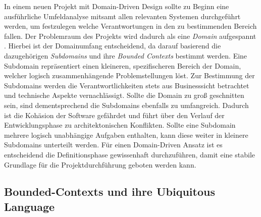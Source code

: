 In einem neuen Projekt mit Domain-Driven Design sollte zu Beginn eine ausführliche Umfeldanalyse mitsamt allen relevanten Systemen durchgeführt werden, um festzulegen welche Verantwortungen in den zu bestimmenden Bereich fallen. Der Problemraum des Projekts wird dadurch als eine \emph{Domain} aufgespannt \cite[S. 56]{Vernon.2015}. Hierbei ist der Domainumfang entscheidend, da darauf basierend die dazugehörigen \emph{Subdomains} und ihre \emph{Bounded Contexts} bestimmt werden. Eine Subdomain repräsentiert einen kleineren, spezifischeren Bereich der Domain, welcher logisch zusammenhängende Problemstellungen löst. Zur Bestimmung der Subdomains werden die Verantwortlichkeiten stets aus Businesssicht betrachtet und technische Aspekte vernachlässigt. Sollte die Domain zu groß geschnitten sein, sind dementsprechend die Subdomains ebenfalls zu umfangreich. Dadurch ist die Kohäsion der Software gefährdet und führt über den Verlauf der Entwicklungsphase zu architektonischen Konflikten. Sollte eine Subdomain mehrere logisch unabhängige Aufgaben enthalten, kann diese weiter in kleinere Subdomains unterteilt werden. Für einen Domain-Driven Ansatz ist es entscheidend die Definitionsphase gewissenhaft durchzuführen, damit eine stabile Grundlage für die Projektdurchführung geboten werden kann. 

\subsection{Bounded-Contexts und ihre Ubiquitous Language}

